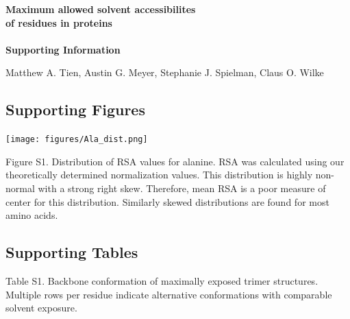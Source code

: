 \documentclass[12pt]{article}
\begin{document}
\begin{center}
\Large\textbf{Maximum allowed solvent accessibilites\\of residues in proteins}\\
\large\mbox{}\\
\textbf{Supporting Information}
\end{center}

\bigskip
\begin{center}
Matthew A. Tien, Austin G. Meyer, Stephanie J. Spielman, Claus O. Wilke
\end{center}
\bigskip

\subsection*{Supporting Figures}
\centerline{\texttt{[image: figures/Ala\_dist.png]}}

\noindent Figure S1. Distribution of RSA values for alanine. RSA was calculated using our theoretically determined normalization values. This distribution is highly non-normal with a strong right skew. Therefore, mean RSA is a poor measure of center for this distribution. Similarly skewed distributions are found for most amino acids.




\newpage
\subsection*{Supporting Tables}

\noindent Table S1. Backbone conformation of maximally exposed trimer structures. Multiple rows per residue indicate alternative conformations with comparable solvent exposure.
\end{document}
